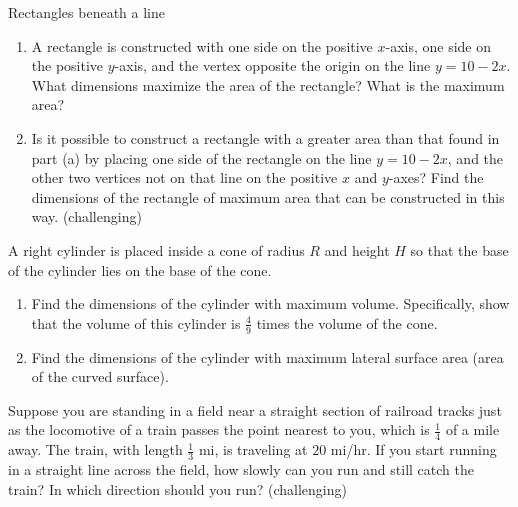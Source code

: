 \documentclass[handout,nooutcomes]{ximera}
\begin{document}
\begin{problem}
Rectangles beneath a line

	\begin{enumerate}
	
	\item  A rectangle is constructed with one side on the positive $x$-axis, one side on the positive $y$-axis, and the vertex opposite the origin on the line $y=10-2x$.  What dimensions maximize the area of the rectangle?  What is the maximum area?
	
	\item  Is it possible to construct a rectangle with a greater area than that found in part (a) by placing one side of the rectangle on the line $y=10-2x$, and the other two vertices not on that line on the positive $x$ and $y$-axes?  Find the dimensions of the rectangle of maximum area that can be constructed in this way. (challenging)
	
	\end{enumerate}
\end{problem}



\begin{problem}
A right cylinder is placed inside a cone of radius $R$ and height $H$ so that the base of the cylinder lies on the base of the cone.

	\begin{enumerate}
	
	\item  Find the dimensions of the cylinder with maximum volume.  Specifically, show that the volume of this cylinder is $\frac{4}{9}$ times the volume of the cone.
	
	\item  Find the dimensions of the cylinder with maximum lateral surface area (area of the curved surface).
	
	\end{enumerate}
\end{problem}



\begin{problem}
Suppose you are standing in a field near a straight section of railroad tracks just as the locomotive of a train passes the point nearest to you, which is $\frac{1}{4}$ of a mile away.  The train, with length $\frac{1}{3}$ mi, is traveling at $20$ mi/hr.  If you start running in a straight line across the field, how slowly can you run and still catch the train?  In which direction should you run? (challenging)
\end{problem}






	
	
	
	
	
	
	
	
	

	










								
				
				
	
\end{document}
